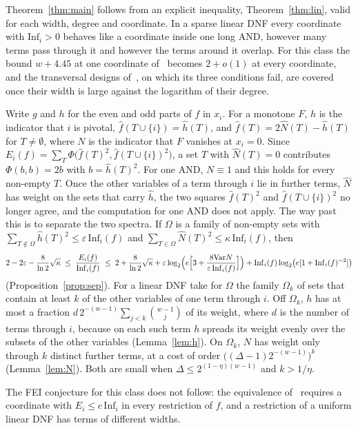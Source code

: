 \documentclass[11pt]{amsart}
\theoremstyle{remark}
\newcommand{\Inf}{\mathrm{Inf}}
\newcommand{\Var}{\mathrm{Var}}
\begin{document}
Theorem~\ref{thm:main} follows from an explicit inequality, Theorem~\ref{thm:lin}, valid for each width, degree and
coordinate. In a sparse linear DNF every coordinate with $\Inf_i>0$ behaves like a coordinate inside one long AND,
however many terms pass through it and however the terms around it overlap. For this class the bound $w+4.45$ at one
coordinate of~\cite{ShmGood} becomes $2+o(1)$ at every coordinate, and the transversal designs of~\cite{ShmCensus}, on
which its three conditions fail, are covered once their width is large against the logarithm of their degree.

Write $g$ and $h$ for the even and odd parts of $f$ in $x_i$. For a monotone $F$, $h$ is the indicator that $i$ is
pivotal, $\hat f(T\cup\{i\})=\hat h(T)$, and $\hat f(T)=2\hat N(T)-\hat h(T)$ for $T\ne\emptyset$, where $N$ is the
indicator that $F$ vanishes at $x_i=0$. Since $E_i(f)=\sum_T\Phi\bigl(\hat f(T)^2,\hat f(T\cup\{i\})^2\bigr)$, a set $T$
with $\hat N(T)=0$ contributes $\Phi(b,b)=2b$ with $b=\hat h(T)^2$. For one AND, $N\equiv1$ and this holds for every
non-empty $T$. Once the other variables of a term through $i$ lie in further terms, $\hat N$ has weight on the sets that
carry $\hat h$, the two squares $\hat f(T)^2$ and $\hat f(T\cup\{i\})^2$ no longer agree, and the computation for one
AND does not apply. The way past this is to separate the two spectra. If $\Omega$ is a family of non-empty sets with
$\sum_{T\notin\Omega}\hat h(T)^2\le\varepsilon\,\Inf_i(f)$ and $\sum_{T\in\Omega}\hat N(T)^2\le\kappa\,\Inf_i(f)$, then
\[
2-2\varepsilon-\frac{8}{\ln2}\sqrt\kappa\;\le\;\frac{E_i(f)}{\Inf_i(f)}\;\le\;2+\frac{8}{\ln2}\sqrt\kappa
+\varepsilon\log_2\Bigl(e\Bigl[3+\frac{8\Var N}{\varepsilon\,\Inf_i(f)}\Bigr]\Bigr)
+\Inf_i(f)\log_2\bigl(e[1+\Inf_i(f)^{-2}]\bigr)
\]
(Proposition~\ref{prop:sep}). For a linear DNF take for $\Omega$ the family $\Omega_k$ of sets that contain at least $k$
of the other variables of one term through $i$. Off $\Omega_k$, $h$ has at most a fraction
$d\,2^{-(w-1)}\sum_{j<k}\binom{w-1}{j}$ of its weight, where $d$ is the number of terms through $i$, because on each such
term $h$ spreads its weight evenly over the subsets of the other variables (Lemma~\ref{lem:h}). On $\Omega_k$, $N$ has
weight only through $k$ distinct further terms, at a cost of order $\bigl((\Delta-1)2^{-(w-1)}\bigr)^k$
(Lemma~\ref{lem:N}). Both are small when $\Delta\le2^{(1-\eta)(w-1)}$ and $k>1/\eta$.

The FEI conjecture for this class does not follow: the equivalence of~\cite{Shm1} requires a coordinate with
$E_i\le c\,\Inf_i$ in every restriction of $f$, and a restriction of a uniform linear DNF has terms of different widths.
\end{document}
